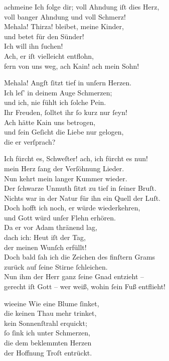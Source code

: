 \documentclass[tocstyle=ref-genre]{ees}
\begin{document}
{\begin{movement}{achmeine}
  \voice[Eva]
  Ich folge dir; voll Ahndung iſt dies Herz,\\
  voll banger Ahndung und voll Schmerz!\\
  Mehala! Thirza! bleibet, meine Kinder,\\
  und betet für den Sünder!\\
  Ich will ihn ſuchen!\\
  Ach, er iſt vielleicht entflohn,\\
  fern von uns weg, ach Kain! ach mein Sohn!

  \voice[Thirza]
  Mehala! Angſt ſitzt tief in unſern Herzen.\\
  Ich leſ’ in deinem Auge Schmerzen;\\
  und ich, nie fühlt ich ſolche Pein.\\
  Ihr Freuden, ſolltet ihr ſo kurz nur ſeyn!\\
  Ach hätte Kain uns betrogen,\\
  und ſein Geſicht die Liebe nur gelogen,\\
  die er verſprach?

  \voice[Mehala]
  Ich fürcht es, Schweſter! ach, ich fürcht es nun!\\
  mein Herz ſang der Verſöhnung Lieder.\\
  Nun kehrt mein langer Kummer wieder.\\
  Der ſchwarze Unmuth ſitzt zu tief in ſeiner Bruſt.\\
  Nichts war in der Natur für ihn ein Quell der Luſt.\\
  Doch hofft ich noch, er würde wiederkehren,\\
  und Gott würd unſer Flehn erhören.\\
  Da er vor Adam thränend lag,\\
  dach ich: Heut iſt der Tag,\\
  der meinen Wunſch erfüllt!\\
  Doch bald ſah ich die Zeichen des finſtern Grams\\
  zurück auf ſeine Stirne ſchleichen.\\
  Nun ihm der Herr ganz ſeine Gnad entzieht –\\
  gerecht iſt Gott – wer weiß, wohin ſein Fuß entflieht!
\end{movement}

\begin{movement}{wieeine}
  \voice[Mehala]
  Wie eine Blume ſinket,\\
  die keinen Thau mehr trinket,\\
  kein Sonnenſtrahl erquickt;\\
  ſo ſink ich unter Schmerzen,\\
  die dem beklemmten Herzen\\
  der Hoffnung Troſt entrückt.
\end{movement}

}
\end{document}
